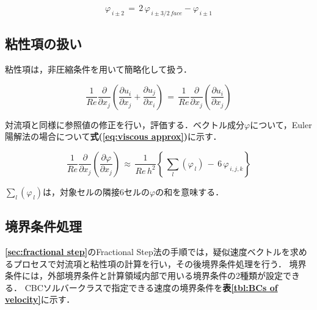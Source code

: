 \begin{equation}
\varphi_{\,i\pm2} \,=\, 2 \,\varphi_{\,i\pm3/2\, face} - \varphi_{\,i\pm1}
\label{eq:solid face reference 2}
\end{equation}

%
\subsection{粘性項の扱い}
粘性項は，非圧縮条件を用いて簡略化して扱う．

\begin{equation}
\frac{1}{Re} \frac{\partial}{\partial x_j} \left( \frac{\partial u_i}{\partial x_j} + \frac{\partial u_j}{\partial x_i} \right)
\,=\, \frac{1}{Re} \frac{\partial}{\partial x_j} \left( \frac{\partial u_i}{\partial x_j} \right) 
\label{eq:viscous incomp approx}
\end{equation}

\noindent 対流項と同様に参照値の修正を行い，評価する．ベクトル成分$\varphi$について，Euler陽解法の場合について\textbf{式(\ref{eq:viscous approx})}に示す．

\begin{equation}
\frac{1}{Re} \frac{\partial}{\partial x_j} \left( \frac{\partial \varphi}{\partial x_j} \right)
\,\approx\, \frac{1}{Re\,h^2} \left\{\, \sum \limits_l \left( \varphi_{\,l} \right) \,-\, 6 \,\varphi_{\,i,j,k} \right\}
\label{eq:viscous approx}
\end{equation}

\noindent $\sum \limits_l \left( \varphi_{\,l} \right)$は，対象セルの隣接6セルの$\varphi$の和を意味する．


%
\subsection{境界条件処理}
\textbf{\ref{sec:fractional step}}のFractional Step法の手順では，疑似速度ベクトルを求めるプロセスで対流項と粘性項の計算を行い，その後境界条件処理を行う．
境界条件には，外部境界条件と計算領域内部で用いる境界条件の2種類が設定できる．
CBCソルバークラスで指定できる速度の境界条件を\textbf{表\ref{tbl:BCs of velocity}}に示す．

